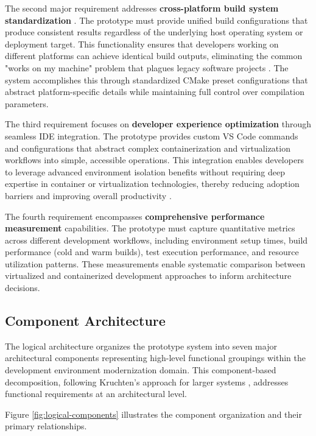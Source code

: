The second major requirement addresses \textbf{cross-platform build system standardization} \citep{gygiCppBuildLargeScaleAutomatic2021}.
The prototype must provide unified build configurations that produce consistent results regardless of the underlying host operating system or deployment target.
This functionality ensures that developers working on different platforms can achieve identical build outputs, eliminating the common "works on my machine" problem that plagues legacy software projects \citep{pengReproducibleResearchComputational2011}.
The system accomplishes this through standardized CMake preset configurations that abstract platform-specific details while maintaining full control over compilation parameters.

The third requirement focuses on \textbf{developer experience optimization} through seamless IDE integration.
The prototype provides custom VS Code commands and configurations that abstract complex containerization and virtualization workflows into simple, accessible operations.
This integration enables developers to leverage advanced environment isolation benefits without requiring deep expertise in container or virtualization technologies, thereby reducing adoption barriers and improving overall productivity \citep{danilovVSCodeDockerized2022, luDevelopmentDockerContainers2018}.

The fourth requirement encompasses \textbf{comprehensive performance measurement} capabilities.
The prototype must capture quantitative metrics across different development workflows, including environment setup times, build performance (cold and warm builds), test execution performance, and resource utilization patterns.
These measurements enable systematic comparison between virtualized and containerized development approaches to inform architecture decisions.

\subsection{Component Architecture}

The logical architecture organizes the prototype system into seven major architectural components representing high-level functional groupings within the development environment modernization domain.
This component-based decomposition, following Kruchten's approach for larger systems \citep{kruchten4+1ViewModel1995}, addresses functional requirements at an architectural level.

Figure \ref{fig:logical-components} illustrates the component organization and their primary relationships.

